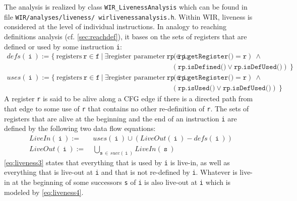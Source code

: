 The analysis is realized by class \texttt{WIR\_LivenessAnalysis} which can be found in file \texttt{WIR/analyses/liveness/ wirlivenessanalysis.h}.
Within \gls{WIR}, liveness is considered at the level of individual instructions.
In analogy to reaching definitions analysis (cf. \cref{sec:reachdef}), it bases on the sets of registers that are defined or used by some instruction \texttt{i}:
\begin{align}
  \textit{defs}(\ \texttt{i}\ ) := \{\ \text{registers}\ \texttt{r} \in \texttt{f}\ \vert\ \exists \text{register parameter}\ \texttt{rp} \in \texttt{i}:\ & (\texttt{rp.getRegister()} = \texttt{r})\ \wedge\label{eq:liveness1} \\
                                                                                                                                                            & (\texttt{rp.isDefined()} \vee \texttt{rp.isDefUsed()})\ \} \nonumber \\
  \textit{uses}(\ \texttt{i}\ ) := \{\ \text{registers}\ \texttt{r} \in \texttt{f}\ \vert\ \exists \text{register parameter}\ \texttt{rp} \in \texttt{i}:\ & (\texttt{rp.getRegister()} = \texttt{r})\ \wedge\label{eq:liveness2} \\
                                                                                                                                                            & (\texttt{rp.isUsed()} \vee \texttt{rp.isDefUsed()})\ \} \nonumber
\end{align}
A register \texttt{r} is said to be alive along a \gls{CFG} edge if there is a directed path from that edge to some use of \texttt{r} that contains no other re-definition of \texttt{r}.
The sets of registers that are alive at the beginning and the end of an instruction \texttt{i} are defined by the following two data flow equations:
\begin{align}
  \textit{LiveIn}(\ \texttt{i}\ ) :=\ & \textit{uses}(\ \texttt{i}\ ) \cup (\textit{LiveOut}(\ \texttt{i}\ ) - \textit{defs}(\ \texttt{i}\ ))\label{eq:liveness3} \\
  \textit{LiveOut}(\ \texttt{i}\ ) :=\ & \bigcup\limits_{\texttt{s}\,\in\,\textit{succ}(\ \texttt{i}\ )} \textit{LiveIn}(\ \texttt{s}\ )\label{eq:liveness4}
\end{align}
\cref{eq:liveness3} states that everything that is used by \texttt{i} is live-in, as well as everything that is live-out at \texttt{i} and that is not re-defined by \texttt{i}.
Whatever is live-in at the beginning of some successors \texttt{s} of \texttt{i} is also live-out at \texttt{i} which is modeled by \cref{eq:liveness4}.

